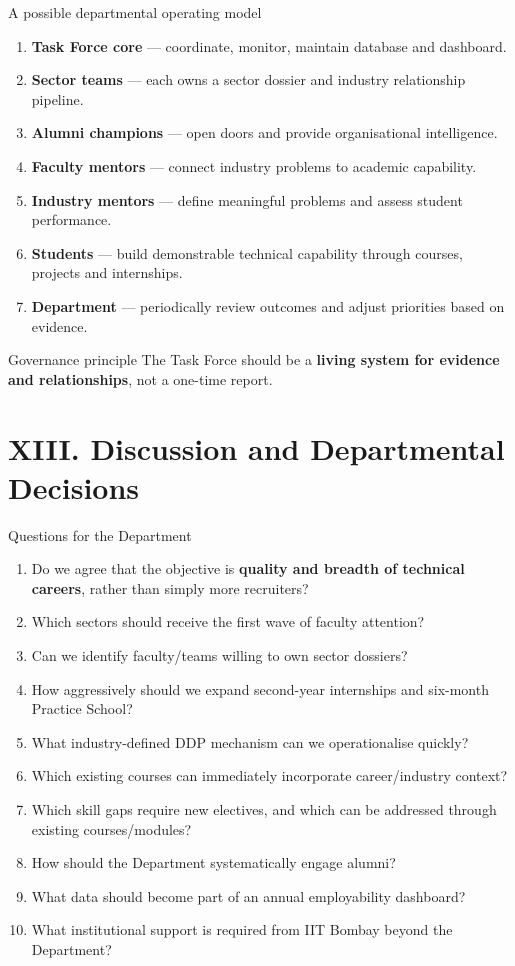 \documentclass[aspectratio=169,11pt]{beamer}
\newcommand{\key}[1]{\textbf{\color{IITblue}#1}}
\begin{document}
\begin{frame}{A possible departmental operating model}
\begin{enumerate}
\item \key{Task Force core} — coordinate, monitor, maintain database and dashboard.
\item \key{Sector teams} — each owns a sector dossier and industry relationship pipeline.
\item \key{Alumni champions} — open doors and provide organisational intelligence.
\item \key{Faculty mentors} — connect industry problems to academic capability.
\item \key{Industry mentors} — define meaningful problems and assess student performance.
\item \key{Students} — build demonstrable technical capability through courses, projects and internships.
\item \key{Department} — periodically review outcomes and adjust priorities based on evidence.
\end{enumerate}
\vspace{4mm}
\begin{block}{Governance principle}
The Task Force should be a \key{living system for evidence and relationships}, not a one-time report.
\end{block}
\end{frame}

\section{XIII. Discussion and Departmental Decisions}
\begin{frame}{Questions for the Department}
\begin{enumerate}
\item Do we agree that the objective is \key{quality and breadth of technical careers}, rather than simply more recruiters?
\item Which sectors should receive the first wave of faculty attention?
\item Can we identify faculty/teams willing to own sector dossiers?
\item How aggressively should we expand second-year internships and six-month Practice School?
\item What industry-defined DDP mechanism can we operationalise quickly?
\item Which existing courses can immediately incorporate career/industry context?
\item Which skill gaps require new electives, and which can be addressed through existing courses/modules?
\item How should the Department systematically engage alumni?
\item What data should become part of an annual employability dashboard?
\item What institutional support is required from IIT Bombay beyond the Department?
\end{enumerate}
\end{frame}
\end{document}
